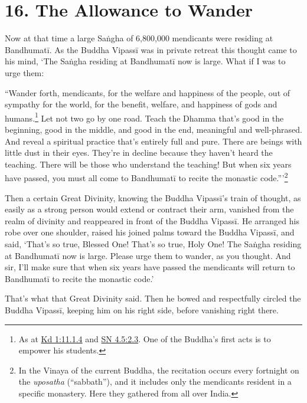 \documentclass[12pt,openany]{book}%
\begin{document}
\section*{16. The Allowance to Wander }

Now at that time a large \textsanskrit{Saṅgha} of 6,800,000 mendicants were residing at \textsanskrit{Bandhumatī}. As the Buddha \textsanskrit{Vipassī} was in private retreat this thought came to his mind, ‘The \textsanskrit{Saṅgha} residing at \textsanskrit{Bandhumatī} now is large. What if I was to urge them: 

“Wander forth, mendicants, for the welfare and happiness of the people, out of sympathy for the world, for the benefit, welfare, and happiness of gods and humans.\footnote{As at \href{https://suttacentral.net/pli-tv-kd1/en/sujato\#11.1.4}{Kd 1:11.1.4} and \href{https://suttacentral.net/sn4.5/en/sujato\#2.3}{SN 4.5:2.3}. One of the Buddha’s first acts is to empower his students. } Let not two go by one road. Teach the Dhamma that’s good in the beginning, good in the middle, and good in the end, meaningful and well-phrased. And reveal a spiritual practice that’s entirely full and pure. There are beings with little dust in their eyes. They’re in decline because they haven’t heard the teaching. There will be those who understand the teaching! But when six years have passed, you must all come to \textsanskrit{Bandhumatī} to recite the monastic code.”’\footnote{In the Vinaya of the current Buddha, the recitation occurs every fortnight on the \textit{uposatha} (“sabbath”), and it includes only the mendicants resident in a specific monastery. Here they gathered from all over India. } 

Then a certain Great Divinity, knowing the Buddha \textsanskrit{Vipassī}’s train of thought, as easily as a strong person would extend or contract their arm, vanished from the realm of divinity and reappeared in front of the Buddha \textsanskrit{Vipassī}. He arranged his robe over one shoulder, raised his joined palms toward the Buddha \textsanskrit{Vipassī}, and said, ‘That’s so true, Blessed One! That’s so true, Holy One! The \textsanskrit{Saṅgha} residing at \textsanskrit{Bandhumatī} now is large. Please urge them to wander, as you thought. And sir, I’ll make sure that when six years have passed the mendicants will return to \textsanskrit{Bandhumatī} to recite the monastic code.’ 

That’s what that Great Divinity said. Then he bowed and respectfully circled the Buddha \textsanskrit{Vipassī}, keeping him on his right side, before vanishing right there. 
\end{document}
